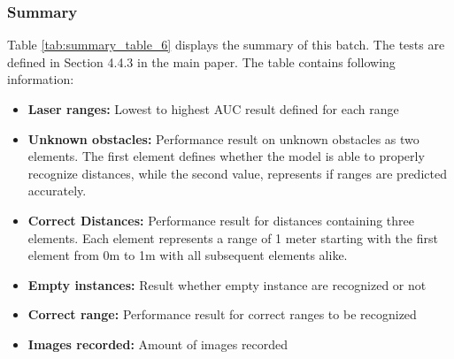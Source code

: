 \subsubsection{Summary\label{summary_batch_6} }
Table \ref{tab:summary_table_6} displays the summary of this batch. The tests are defined in Section 4.4.3 in the main paper. The table contains following information:
\begin{itemize}
\item  \textbf{Laser ranges: }Lowest to highest AUC result defined for each range
\item  \textbf{Unknown obstacles: }Performance result on unknown obstacles as two elements. The first element defines whether the model is able to properly recognize distances, while the second value, represents if ranges are predicted accurately.
\item  \textbf{Correct Distances: }Performance result for distances containing three elements. Each element represents a range of 1 meter starting with the first element from 0m to 1m with all subsequent elements alike.
\item  \textbf{Empty instances: }Result whether empty instance are recognized or not
\item  \textbf{Correct range: }Performance result for correct ranges to be recognized
\item  \textbf{Images recorded: }Amount of images recorded
\end{itemize}


